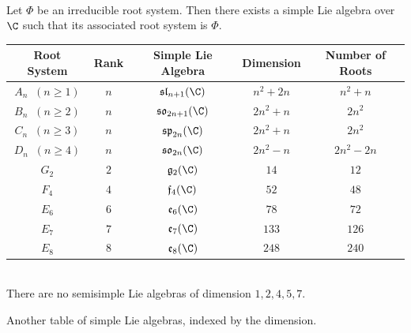 \documentclass[a4paper]{article}
\begin{document}
\begin{crl}{}{} \\Let $\Phi$ be an irreducible root system. Then there exists a simple Lie algebra over $\C$ such that its associated root system is $\Phi$. 
\end{crl}

\begin{table}[!h]
\centering
\begin{tabular}{|c|c|c|c|c|}
\hline
Root System                                        & Rank & Simple Lie Algebra         & Dimension & Number of Roots \\ \hline
$A_n\;\;(n\geq 1)$ & $n$  & $\mathfrak{sl}_{n+1}(\C)$      & $n^2+2n$  & $n^2+n$         \\
$B_n\;\;(n\geq 2)$ & $n$  & $\mathfrak{so}_{2n+1}(\C)$ & $2n^2+n$  & $2n^2$          \\
$C_n\;\;(n\geq 3)$ & $n$  & $\mathfrak{sp}_{2n}(\C)$   & $2n^2+n$  & $2n^2$          \\
$D_n\;\;(n\geq 4)$ & $n$  & $\mathfrak{so}_{2n}(\C)$   & $2n^2-n$  & $2n^2-2n$       \\
$G_2$                                              & $2$  & $\mathfrak{g}_2(\C)$      & $14$      & $12$            \\
$F_4$                                              & $4$  & $\mathfrak{f}_4(\C)$       & $52$      & $48$            \\
$E_6$                                              & $6$  & $\mathfrak{e}_6(\C)$       & $78$      & $72$            \\
$E_7$                                              & $7$  & $\mathfrak{e}_7(\C)$       & $133$     & $126$           \\
$E_8$                                              & $8$  & $\mathfrak{e}_8(\C)$       & $248$     & $240$           \\ \hline
\end{tabular}
\end{table}

\begin{crl}{}{} \\There are no semisimple Lie algebras of dimension $1,2,4,5,7$. 
\end{crl}

Another table of simple Lie algebras, indexed by the dimension. 
\end{document}
